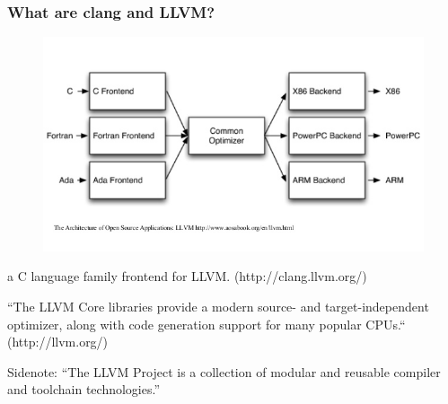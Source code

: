 \begin{frame}
  \frametitle{What are clang and LLVM?}
  \begin{figure}
    \centering
    \includegraphics[scale=0.3]{input/content/figures/clang-llvm}
  \end{figure}
%
\begin{description}[short]
  \item[clang] a C language family frontend for LLVM. (http://clang.llvm.org/)
  \item[LLVM] ``The LLVM Core libraries provide a modern
    source- and target-independent optimizer, along with
    code generation support for many popular CPUs.`` (http://llvm.org/)
\end{description}
%
Sidenote: ``The LLVM Project is a collection of modular and
reusable compiler and toolchain technologies.''


\end{frame}
